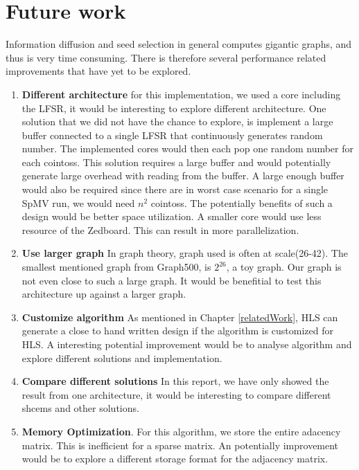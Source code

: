 \chapter{Future work} \label{futureWork}
Information diffusion and seed selection in general computes gigantic graphs, and thus is very time consuming. There is therefore several performance related improvements that have yet to be explored.

\begin{enumerate}
\item \textbf{Different architecture} for this implementation, we used a core including the LFSR, it would be interesting to explore different architecture. One solution that we did not have the chance to explore, is implement a large buffer connected to a single LFSR that continuously generates random number. The implemented cores would then each pop one random number for each cointoss. This solution requires a large buffer and would potentially generate large overhead with reading from the buffer. A large enough buffer  would also be required since there are in worst case scenario for a single SpMV run, we would need $n^2$ cointoss. The potentially benefits of such a design would be better space utilization. A smaller core would use less resource of the Zedboard. This can result in more parallelization.

\item \textbf{Use larger graph} In graph theory, graph used is often at scale(26-42). The smallest mentioned graph from Graph500, is $2^{26}$, a toy graph. Our graph is not even close to such a large graph. It would be benefitial to test this architecture up against a larger graph. 

\item \textbf{Customize algorithm} As mentioned in Chapter \ref{relatedWork}, HLS can generate a close to hand written design if the algorithm is customized for HLS. A interesting potential improvement would be to analyse algorithm and explore different solutions and implementation.

\item \textbf{Compare different solutions} In this report, we have only showed the result from one architecture, it would be interesting to compare different shcems and other solutions. 

\item \textbf{Memory Optimization}. For this algorithm, we store the entire adacency matrix. This is inefficient for a sparse matrix. An potentially improvement would be to explore a different storage format for the adjacency matrix.


\end{enumerate}
